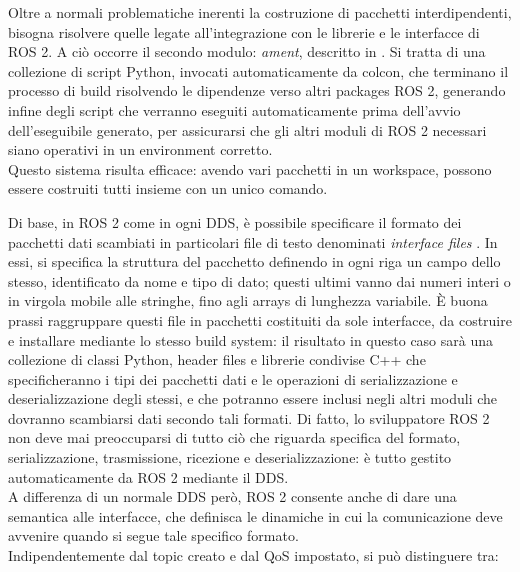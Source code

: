 Oltre a normali problematiche inerenti la costruzione di pacchetti interdipendenti, bisogna risolvere quelle legate all'integrazione con le librerie e le interfacce di ROS 2. A ciò occorre il secondo modulo: \emph{ament}, descritto in \cite{ros2_ament}. Si tratta di una collezione di script Python, invocati automaticamente da colcon, che terminano il processo di build risolvendo le dipendenze verso altri packages ROS 2, generando infine degli script che verranno eseguiti automaticamente prima dell'avvio dell'eseguibile generato, per assicurarsi che gli altri moduli di ROS 2 necessari siano operativi in un environment corretto.\\
Questo sistema risulta efficace: avendo vari pacchetti in un workspace, possono essere costruiti tutti insieme con un unico comando.\vfill\newpage

\indent Di base, in ROS 2 come in ogni DDS, è possibile specificare il formato dei pacchetti dati scambiati in particolari file di testo denominati \emph{interface files} \cite{ros2_interface}. In essi, si specifica la struttura del pacchetto definendo in ogni riga un campo dello stesso, identificato da nome e tipo di dato; questi ultimi vanno dai numeri interi o in virgola mobile alle stringhe, fino agli arrays di lunghezza variabile. È buona prassi raggruppare questi file in pacchetti costituiti da sole interfacce, da costruire e installare mediante lo stesso build system: il risultato in questo caso sarà una collezione di classi Python, header files e librerie condivise C++ che specificheranno i tipi dei pacchetti dati e le operazioni di serializzazione e deserializzazione degli stessi, e che potranno essere inclusi negli altri moduli che dovranno scambiarsi dati secondo tali formati. Di fatto, lo sviluppatore ROS 2 non deve mai preoccuparsi di tutto ciò che riguarda specifica del formato, serializzazione, trasmissione, ricezione e deserializzazione: è tutto gestito automaticamente da ROS 2 mediante il DDS.\\
A differenza di un normale DDS però, ROS 2 consente anche di dare una semantica alle interfacce, che definisca le dinamiche in cui la comunicazione deve avvenire quando si segue tale specifico formato.\\
Indipendentemente dal topic creato e dal QoS impostato, si può distinguere tra:
